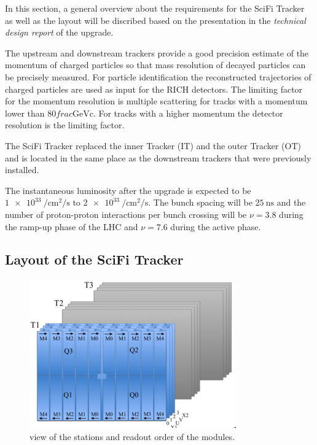 In this section, a general overview about the requirements for the SciFi Tracker as well as the layout will be discribed based on the presentation in the \textit{technical design report}\cite{scifiInfo} of the upgrade.

The upstream and downstream trackers provide a good precision estimate of the momentum of charged particles so that mass resolution of decayed particles can be precisely measured.
For particle identification the reconstructed trajectories of charged particles are used as input for the RICH detectors.
The limiting factor for the momentum resolution is multiple scattering for tracks with a momentum lower than $\num{80}frac{\text{GeV}}{\text{c}}$. For tracks with a higher momentum the detector resolution is the limiting factor.

The SciFi Tracker replaced the inner Tracker (IT) and the outer Tracker (OT)
and is located in the same place as the downstream trackers that were previously installed.

The instantaneous luminosity after the upgrade is expected to be $\SI{1e33}{\per\centi\metre\squared\per\second}$ to $\SI{2e33}{\per\centi\metre\squared\per\second}$. The bunch spacing will be $\SI{25}{\nano\second}$ and the number of proton-proton interactions per bunch crossing will be $\nu = 3.8$ during the ramp-up phase of the LHC and $\nu = 7.6$ during the active phase.

\subsection{Layout of the SciFi Tracker}

\begin{figure}
  \centering
  \includegraphics{plots/SciFi_Tracker.png}
  \caption{view of the stations and readout order of the modules.}
  \label{fig:scifi}
\end{figure}

